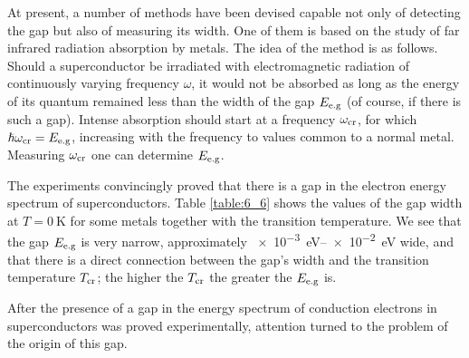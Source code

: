 At present, a number of methods have been devised capable not only of detecting the gap but also of measuring its width. One of them is based on the study of far infrared radiation absorption by metals. The idea of the method is as follows. Should a superconductor be irradiated with electromagnetic radiation of continuously varying frequency $\omega$, it would not be absorbed as long as the energy of its quantum remained less than the width of the gap $E_{\text{e.g}}$ (of course,
if there is such a gap). Intense absorption should start at a frequency $\omega_{\text{cr}}$, for which $\hslash\omega_{\text{cr}}=E_{\text{e.g}}$, increasing with the frequency to values common to a normal metal. Measuring $\omega_{\text{cr}}$ one can determine $E_{\text{e.g}}$.

The experiments convincingly proved that there is a gap in the electron energy spectrum of superconductors. Table \ref{table:6_6} shows the
values of the gap width at $T=\SI{0}{\kelvin}$ for some metals together with the transition temperature. We see that the gap $E_{\text{e.g}}$ is very narrow, approximately \SIrange{e-3}{e-2}{\electronvolt} wide, and that there is a direct connection between the gap's width and the transition temperature $T_{\text{cr}}$; the higher the $T_{\text{cr}}$ the greater the $E_{\text{e.g}}$ is.

\begin{table}[!b]
	\renewcommand{\arraystretch}{1.2}
	\caption{}
	\vspace{-0.6cm}
	\label{table:6_6}
	\begin{center}\end{center}
\end{table}

After the presence of a gap in the energy spectrum of conduction electrons in superconductors was proved experimentally, attention turned to the problem of the origin of this gap.

